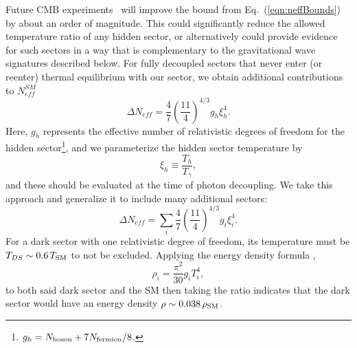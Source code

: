 \documentclass[nofootinbib,twocolumn,preprintnumbers]{revtex4-1}
\begin{document}
Future CMB experiments~\cite{Abazajian:2016yjj} will improve the bound from Eq.~(\ref{eqn:neffBounds}) by about an order of magnitude. This could significantly reduce the allowed temperature ratio of any hidden sector, or alternatively could provide evidence for such sectors in a way that is complementary to the gravitational wave signatures described below. 
For fully decoupled sectors that never enter (or reenter) thermal equilibrium with our sector, we obtain additional contributions to $N^{SM}_{eff}$ \cite{Breitbach:2018ddu}
\begin{equation}\label{eqn:DeltaNeff1hs}
\Delta N_{eff} = \frac{4}{7}\left(\frac{11}{4}\right)^{4/3}g_h \xi_h^4.
\end{equation} 
Here, $g_h$ represents the effective number of relativistic degrees of freedom for the hidden sector\footnote{$g_h = N_{\rm boson} + 7 N_{\rm fermion}/8$.}, and we parameterize the hidden sector temperature by~\cite{Breitbach:2018ddu}
\begin{equation}
\xi_h \equiv  \frac{T_{h}}{T_{\gamma}},
\label{eq:xi}
\end{equation}
and these should be evaluated at the time of photon decoupling. 
%
%
We take this approach and generalize it to include many additional sectors:
\begin{equation}\label{eqn:DeltaNeff}
\Delta N_{eff} = \sum_i \frac{4}{7}\left(\frac{11}{4}\right)^{4/3}g_{i} \xi^4_{i}.
\end{equation} 
For a dark sector with one relativistic degree of freedom, its temperature must be $T_{DS}\sim 0.6\, T_{\rm SM}$ to not be excluded. Applying the energy density formula \cite{Trodden:2004st},
\begin{equation}
\rho_i = \frac{\pi^2}{30}g_i T_i^4,
\end{equation}
to both said dark sector and the SM then taking the ratio indicates that the dark sector would have an energy density $\rho \sim 0.038\, \rho_{\rm SM}$. 
\end{document}
